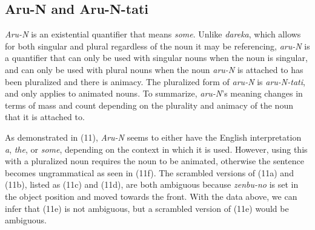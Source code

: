 \documentclass[english, 11pt]{article}
\begin{document}
\subsection{Aru-N and Aru-N-tati}
\emph{Aru-N} is an existential quantifier that means \emph{some}. Unlike \emph{dareka}, which allows for both singular and plural regardless of the noun it may be referencing, \emph{aru-N} is a quantifier that can only be used with singular nouns when the noun is singular, and can only be used with plural nouns when the noun \emph{aru-N} is attached to has been pluralized and there is animacy. The pluralized form of \emph{aru-N} is \emph{aru-N-tati}, and only applies to animated nouns. To summarize, \emph{aru-N}'s meaning changes in terms of mass and count depending on the plurality and animacy of the noun that it is attached to.
\begin{exe}
	\ex 
	\begin{xlist}
		\label{1a}
		\label{1b}
		\label{1a}
		\label{1b}
		\label{1b}
		\label{1b}
	\end{xlist}
\end{exe}
As demonstrated in (11), \emph{Aru-N} seems to either have the English interpretation \emph{a}, \emph{the}, or \emph{some}, depending on the context in which it is used. However, using this with a pluralized noun requires the noun to be animated, otherwise the sentence becomes ungrammatical as seen in (11f). The scrambled versions of (11a) and (11b), listed as (11c) and (11d), are both ambiguous because \emph{zenbu-no} is set in the object position and moved towards the front. With the data above, we can infer that (11e) is not ambiguous, but a scrambled version of (11e) would be ambiguous.
\end{document}
